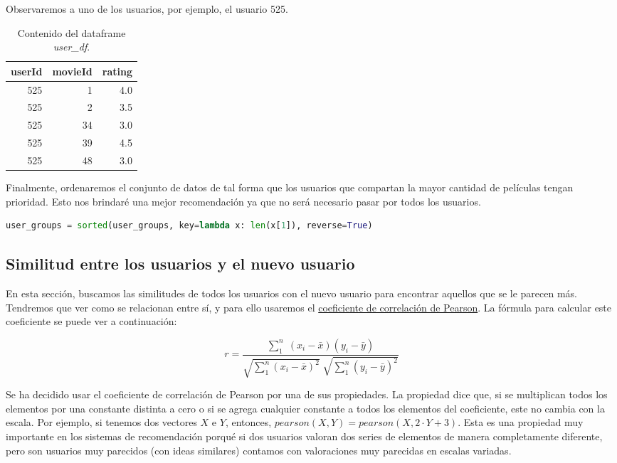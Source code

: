 \documentclass{uimppracticas}
\begin{document}
Observaremos a uno de los usuarios, por ejemplo, el usuario 525.

\begin{table}[h]
	\centering
	\begin{tabular}{rrr}
		\toprule
		userId &  movieId &  rating \\
		\midrule
		525 &        1 &     4.0 \\
		525 &        2 &     3.5 \\
		525 &       34 &     3.0 \\
		525 &       39 &     4.5 \\
		525 &       48 &     3.0 \\
		\bottomrule
	\end{tabular}
\caption{Contenido del dataframe \textit{user\_df}.}
\label{user_525}
\end{table}

Finalmente, ordenaremos el conjunto de datos de tal forma que los usuarios que compartan la mayor cantidad de películas tengan prioridad. Esto nos brindaré una mejor recomendación ya que no será necesario pasar por todos los usuarios. 

\begin{lstlisting}[language=python]
user_groups = sorted(user_groups, key=lambda x: len(x[1]), reverse=True)
\end{lstlisting}

\subsection{Similitud entre los usuarios y el nuevo usuario}

En esta sección, buscamos las similitudes de todos los usuarios con el nuevo usuario para encontrar aquellos que se le parecen más. Tendremos que ver como se relacionan entre sí, y para ello usaremos el \href{https://es.wikipedia.org/wiki/Coeficiente_de_correlaci\%C3\%B3n_de_Pearson}{coeficiente de correlación de Pearson}. La fórmula para calcular este coeficiente se puede ver a continuación:

\begin{equation}\label{formula}
	r = \frac{\sum_{1}^{n} \; (x_{i} - \bar{x}) (y_{i} - \bar{y})}{\sqrt{\sum_{1}^{n}(x_{i} - \bar{x})^2} \; \sqrt{\sum_{1}^{n}(y_{i} - \bar{y})^2}}
\end{equation}

Se ha decidido usar el coeficiente de correlación de Pearson por una de sus propiedades. La propiedad dice que, si se multiplican todos los elementos por una constante distinta a cero o si se agrega cualquier constante a todos los elementos del coeficiente, este no cambia con la escala. Por ejemplo, si tenemos dos vectores $X$ e $Y$, entonces, $pearson(X,Y) = pearson(X,2\cdot Y+3)$. Esta es una propiedad muy importante en los sistemas de recomendación porqué si dos usuarios valoran dos series de elementos de manera completamente diferente, pero son usuarios muy parecidos (con ideas similares) contamos con valoraciones muy parecidas en escalas variadas.
\end{document}
